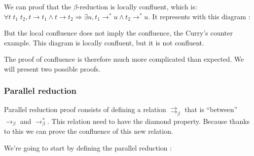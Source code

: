   We can proof that the $\beta$-reduction is locally confluent, which is:
  $\forall t\; t_1\; t_2, t \to t_1 \wedge t \to t_2 \Rightarrow \exists u, t_1
  \to ^* u \wedge t_2 \to^* u$. It represents with this diagram :

  \begin{center}
  \end{center}

  But the local confluence does not imply the confluence, the Curry's counter
  example. This diagram is locally confluent, but it is not confluent.

  \begin{center}
  \end{center}

  The proof of confluence is therefore much more complicated than expected.
  We will present two possible proofs.

  \subsubsection{Parallel reduction}

  Parallel reduction proof consists of defining a relation
  $\rightrightarrows_\beta$ that is ``between'' $\to_\beta$ and $\to_\beta^*$.
  This relation need to have the diamond property. Because thanks to this we can
  prove the confluence of this new relation.

  We're going to start by defining the parallel reduction :


